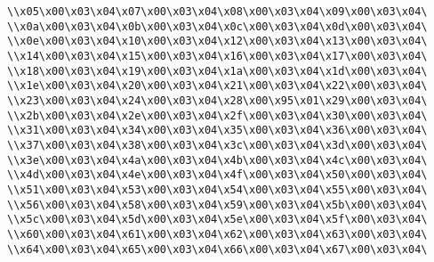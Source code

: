 \verb|\\x05\x00\x03\x04\x07\x00\x03\x04\x08\x00\x03\x04\x09\x00\x03\x04\|\newline
\verb|\\x0a\x00\x03\x04\x0b\x00\x03\x04\x0c\x00\x03\x04\x0d\x00\x03\x04\|\newline
\verb|\\x0e\x00\x03\x04\x10\x00\x03\x04\x12\x00\x03\x04\x13\x00\x03\x04\|\newline
\verb|\\x14\x00\x03\x04\x15\x00\x03\x04\x16\x00\x03\x04\x17\x00\x03\x04\|\newline
\verb|\\x18\x00\x03\x04\x19\x00\x03\x04\x1a\x00\x03\x04\x1d\x00\x03\x04\|\newline
\verb|\\x1e\x00\x03\x04\x20\x00\x03\x04\x21\x00\x03\x04\x22\x00\x03\x04\|\newline
\verb|\\x23\x00\x03\x04\x24\x00\x03\x04\x28\x00\x95\x01\x29\x00\x03\x04\|\newline
\verb|\\x2b\x00\x03\x04\x2e\x00\x03\x04\x2f\x00\x03\x04\x30\x00\x03\x04\|\newline
\verb|\\x31\x00\x03\x04\x34\x00\x03\x04\x35\x00\x03\x04\x36\x00\x03\x04\|\newline
\verb|\\x37\x00\x03\x04\x38\x00\x03\x04\x3c\x00\x03\x04\x3d\x00\x03\x04\|\newline
\verb|\\x3e\x00\x03\x04\x4a\x00\x03\x04\x4b\x00\x03\x04\x4c\x00\x03\x04\|\newline
\verb|\\x4d\x00\x03\x04\x4e\x00\x03\x04\x4f\x00\x03\x04\x50\x00\x03\x04\|\newline
\verb|\\x51\x00\x03\x04\x53\x00\x03\x04\x54\x00\x03\x04\x55\x00\x03\x04\|\newline
\verb|\\x56\x00\x03\x04\x58\x00\x03\x04\x59\x00\x03\x04\x5b\x00\x03\x04\|\newline
\verb|\\x5c\x00\x03\x04\x5d\x00\x03\x04\x5e\x00\x03\x04\x5f\x00\x03\x04\|\newline
\verb|\\x60\x00\x03\x04\x61\x00\x03\x04\x62\x00\x03\x04\x63\x00\x03\x04\|\newline
\verb|\\x64\x00\x03\x04\x65\x00\x03\x04\x66\x00\x03\x04\x67\x00\x03\x04\|\newline
